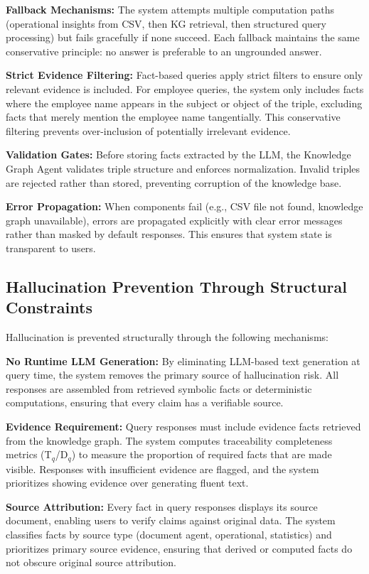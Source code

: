 \textbf{Fallback Mechanisms:} The system attempts multiple computation paths (operational insights from CSV, then KG retrieval, then structured query processing) but fails gracefully if none succeed. Each fallback maintains the same conservative principle: no answer is preferable to an ungrounded answer.

\textbf{Strict Evidence Filtering:} Fact-based queries apply strict filters to ensure only relevant evidence is included. For employee queries, the system only includes facts where the employee name appears in the subject or object of the triple, excluding facts that merely mention the employee name tangentially. This conservative filtering prevents over-inclusion of potentially irrelevant evidence.

\textbf{Validation Gates:} Before storing facts extracted by the LLM, the Knowledge Graph Agent validates triple structure and enforces normalization. Invalid triples are rejected rather than stored, preventing corruption of the knowledge base.

\textbf{Error Propagation:} When components fail (e.g., CSV file not found, knowledge graph unavailable), errors are propagated explicitly with clear error messages rather than masked by default responses. This ensures that system state is transparent to users.

\subsection{Hallucination Prevention Through Structural Constraints}

Hallucination is prevented structurally through the following mechanisms:

\textbf{No Runtime LLM Generation:} By eliminating LLM-based text generation at query time, the system removes the primary source of hallucination risk. All responses are assembled from retrieved symbolic facts or deterministic computations, ensuring that every claim has a verifiable source.

\textbf{Evidence Requirement:} Query responses must include evidence facts retrieved from the knowledge graph. The system computes traceability completeness metrics (T$_q$/D$_q$) to measure the proportion of required facts that are made visible. Responses with insufficient evidence are flagged, and the system prioritizes showing evidence over generating fluent text.

\textbf{Source Attribution:} Every fact in query responses displays its source document, enabling users to verify claims against original data. The system classifies facts by source type (document agent, operational, statistics) and prioritizes primary source evidence, ensuring that derived or computed facts do not obscure original source attribution.

